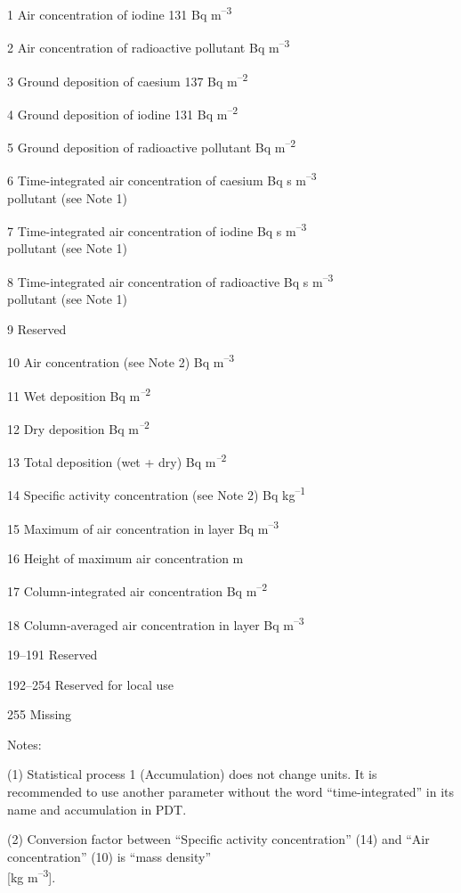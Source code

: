 1 Air concentration of iodine 131 Bq m\textsuperscript{--3}

2 Air concentration of radioactive pollutant Bq m\textsuperscript{--3}

3 Ground deposition of caesium 137 Bq m\textsuperscript{--2}

4 Ground deposition of iodine 131 Bq m\textsuperscript{--2}

5 Ground deposition of radioactive pollutant Bq m\textsuperscript{--2}

6 Time-integrated air concentration of caesium Bq s m\textsuperscript{--3}\\
pollutant (see Note 1)

7 Time-integrated air concentration of iodine Bq s m\textsuperscript{--3}\\
pollutant (see Note 1)

8 Time-integrated air concentration of radioactive Bq s m\textsuperscript{--3}\\
pollutant (see Note 1)

9 Reserved

10 Air concentration (see Note 2) Bq m\textsuperscript{--3}

11 Wet deposition Bq m\textsuperscript{\emph{--}2}

12 Dry deposition Bq m\textsuperscript{\emph{--}2}

13 Total deposition (wet + dry) Bq m\textsuperscript{\emph{--}2}

14 Specific activity concentration (see Note 2) Bq kg\textsuperscript{--1}

15 Maximum of air concentration in layer Bq m\textsuperscript{--3}

16 Height of maximum air concentration m

17 Column-integrated air concentration Bq m\textsuperscript{--2}

18 Column-averaged air concentration in layer Bq m\textsuperscript{--3}

19--191 Reserved

192--254 Reserved for local use

255 Missing

Notes:

(1) Statistical process 1 (Accumulation) does not change units. It is recommended to use another parameter without the word ``time-integrated'' in its name and accumulation in PDT.

(2) Conversion factor between ``Specific activity concentration'' (14) and ``Air concentration'' (10) is ``mass density''\\
{[}kg m\textsuperscript{--3}{]}.

